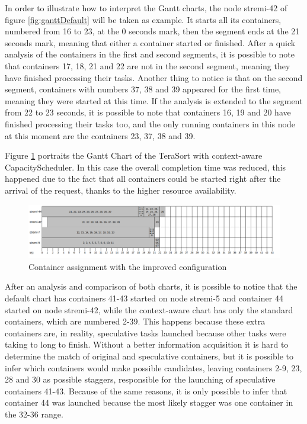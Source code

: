 In order to illustrate how to interpret the Gantt charts, the node stremi-42 of figure \ref{fig:ganttDefault} will be taken as example. It starts all its containers, numbered from 16 to 23, at the 0 seconds mark, then the segment ends at the 21 seconds mark, meaning that either a container started or finished. After a quick analysis of the containers in the first and second segments, it is possible to note that containers 17, 18, 21 and 22 are not in the second segment, meaning they have finished processing their tasks. Another thing to notice is that on the second segment, containers with numbers 37, 38 and 39 appeared for the first time, meaning they were started at this time. If the analysis is extended to the segment from 22 to 23 seconds, it is possible to note that containers 16, 19 and 20 have finished processing their tasks too, and the only running containers in this node at this moment are the containers 23, 37, 38 and 39.

Figure \ref{fig:ganttImproved} portraits the Gantt Chart of the TeraSort with context-aware CapacityScheduler. In this case the overall completion time was reduced, this happened due to the fact that all containers could be started right after the arrival of the request, thanks to the higher resource availability.

\begin{figure}[hbtn]
   \renewcommand{\figurename}{Figure}
   \centering
   \includegraphics[width=15cm]{figuras/Figura17-GanttImproved.png}
   \caption{Container assignment with the improved configuration}
   \label{fig:ganttImproved}
\end{figure}

After an analysis and comparison of both charts, it is possible to notice that the default chart has containers 41-43 started on node stremi-5 and container 44 started on node stremi-42, while the context-aware chart has only the standard containers, which are numbered 2-39. This happens because these extra containers are, in reality, speculative tasks launched because other tasks were taking to long to finish. Without a better information acquisition it is hard to determine the match of original and speculative containers, but it is possible to infer which containers would make possible candidates, leaving containers 2-9, 23, 28 and 30 as possible staggers, responsible for the launching of speculative containers 41-43. Because of the same reasons, it is only possible to infer that container 44 was launched because the most likely stagger was one container in the 32-36 range.

